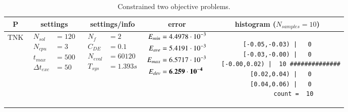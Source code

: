 
\begin{table*} [!t] \centering
\caption{Constrained two objective problems.}
\scriptsize  \setlength{\tabcolsep}{0.5em}

\begin{tabular}[c]{ccccc} \toprule
P & settings & settings/info & error & histogram ($N_{samples}=10$) \\ \hline

TNK
&
{$\!\begin{aligned}
    N_{sol}        &= 120 \\
	N_{cpu}        &= 3 \\
	t_{max}        &= 500 \\
	\Delta t_{exc} &= 50
\end{aligned}$}
&
{$\!\begin{aligned}
	N_{f}    &= 2 \\
	C_{DE}   &= 0.1 \\
	N_{eval} &= 60120 \\
	T_{sys}  &= 1.393s
\end{aligned}$}
&
{$\!\begin{aligned}
    E_{min} &= 4.4978\cdot 10^{-3} \\
    E_{ave} &= 5.4191\cdot 10^{-3} \\
    E_{max} &= 6.5717\cdot 10^{-3} \\
    E_{dev} &= {\bf 6.259\cdot 10^{-4}}
\end{aligned}$}
&
\begin{minipage}{4.1cm} \fontsize{5pt}{6pt}
\begin{verbatim}
 [-0.05,-0.03) |   0 
 [-0.03,-0.00) |   0 
  [-0.00,0.02) |  10 ##############
   [0.02,0.04) |   0 
   [0.04,0.06) |   0 
         count =  10
 \end{verbatim}
\end{minipage} \\

\hline




\end{tabular}
\end{table*}
